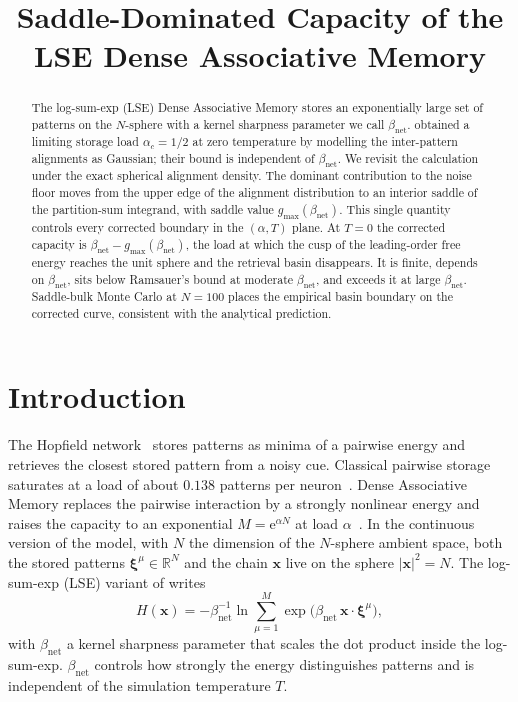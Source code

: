 \documentclass[11pt]{article}
\title{\bfseries Saddle-Dominated Capacity of the\\
LSE Dense Associative Memory}
\author{}
\date{}
\newcommand{\bxi}{\boldsymbol{\xi}}
\newcommand{\bx}{\bm{x}}
\newcommand{\e}{{\mathrm{e}}}
\newcommand{\Bnet}{\beta_{\mathrm{net}}}
\newcommand{\gmax}{g_{\max}}
\begin{document}
\maketitle

\begin{abstract}
\noindent
The log-sum-exp (LSE) Dense Associative Memory stores an exponentially
large set of patterns on the $N$-sphere with a kernel sharpness
parameter we call $\Bnet$.  \citet{ramsauer2021hopfield} obtained a
limiting storage load $\alpha_c = 1/2$ at zero temperature by modelling
the inter-pattern alignments as Gaussian; their bound is independent of
$\Bnet$.  We revisit the calculation under the exact spherical alignment
density.  The dominant contribution to the noise floor moves from the
upper edge of the alignment distribution to an interior saddle of the
partition-sum integrand, with saddle value $\gmax(\Bnet)$.  This single
quantity controls every corrected boundary in the $(\alpha, T)$ plane.
At $T = 0$ the corrected capacity is $\Bnet - \gmax(\Bnet)$, the load
at which the cusp of the leading-order free energy reaches the unit
sphere and the retrieval basin disappears.  It is finite, depends on
$\Bnet$, sits below Ramsauer's bound at moderate $\Bnet$, and exceeds
it at large $\Bnet$.  Saddle-bulk Monte Carlo at $N = 100$ places the
empirical basin boundary on the corrected curve, consistent with the
analytical prediction.
\end{abstract}

\section{Introduction}
\label{sec:intro}

The Hopfield network~\citep{Hopfield1982} stores patterns as minima of a
pairwise energy and retrieves the closest stored pattern from a noisy
cue.  Classical pairwise storage saturates at a load of about $0.138$
patterns per neuron~\citep{amit1987statistical}.  Dense Associative
Memory replaces the pairwise interaction by a strongly nonlinear energy
and raises the capacity to an exponential
$M = \e^{\alpha N}$ at load $\alpha$~\citep{krotov2016dense,
krotov2021large, demircigil2017model}.  In the continuous version of
the model, with $N$ the dimension of the $N$-sphere ambient space, both
the stored patterns $\bxi^\mu \in \mathbb{R}^N$ and the chain $\bx$
live on the sphere $|\bx|^2 = N$.  The log-sum-exp (LSE) variant of
\citet{ramsauer2021hopfield} writes
\begin{equation}
H(\bx) = -\Bnet^{-1} \ln \sum_{\mu=1}^{M}
   \exp\!\bigl(\Bnet\,\bx \cdot \bxi^\mu\bigr),
\label{eq:lse}
\end{equation}
with $\Bnet$ a kernel sharpness parameter that scales the dot product
inside the log-sum-exp.  $\Bnet$ controls how strongly the energy
distinguishes patterns and is independent of the simulation temperature
$T$.
\end{document}
